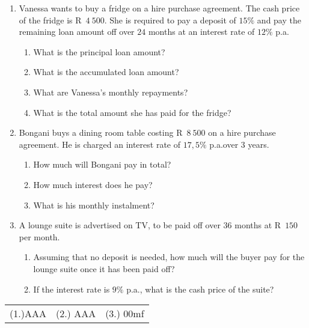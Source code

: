 \begin{exercises}{}{
    \begin{enumerate}[label=\textbf{\arabic*}.]
	\item Vanessa wants to buy a fridge on a hire purchase agreement. The cash price of the fridge is R~$4~500$. She is required to pay a deposit of $15\%$ and pay the remaining loan amount off over $24$ months at an interest rate of $12\%$ p.a.
	\begin{enumerate}[noitemsep, label=\textbf{(\alph*)} ]
	    \item What is the principal loan amount?
	    \item What is the accumulated loan amount?
	    \item What are Vanessa's monthly repayments?
	    \item What is the total amount she has paid for the fridge?
	\end{enumerate}


	\item Bongani buys a dining room table costing R~$8~500$ on a
          hire purchase agreement. He is charged an interest rate of
          $17,5\%$ p.a.\@ over $3$ years.
	\begin{enumerate}[noitemsep, label=\textbf{(\alph*)} ]
	    \item How much will Bongani pay in total?
	    \item How much interest does he pay?
	    \item What is his monthly instalment?
	\end{enumerate}

	\item A lounge suite is advertised on TV, to be paid off over $36$ months at R~$150$ per month.
	\begin{enumerate}[noitemsep, label=\textbf{(\alph*)} ]
	    \item Assuming that no deposit is needed, how much will the buyer pay for the lounge suite once it has been paid off?
	    \item If the interest rate is $9\%$ p.a., what is the cash price of the suite?\\
	\end{enumerate}
    \end{enumerate}
\practiceinfo

    \begin{tabularx}{\textwidth}{ XXX }
	(1.)AAA	&	(2.)	AAA&	(3.) 00mf
    \end{tabularx}
}
\end{exercises}


